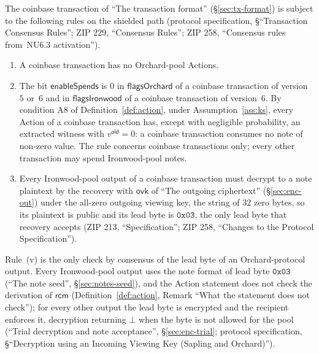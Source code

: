 \documentclass[11pt,a4paper]{article}
\theoremstyle{definition}
\newcommand{\ovk}{\ensuremath{\mathsf{ovk}}}
\newcommand{\rcm}{\ensuremath{\mathsf{rcm}}}
\begin{document}
The coinbase transaction of ``The transaction format''
(\S\ref{sec:tx-format}) is subject to the following rules on the shielded
path (protocol specification, \S``Transaction Consensus Rules''; ZIP 229,
``Consensus Rules''; ZIP 258, ``Consensus rules from~NU6.3 activation'').
\begin{enumerate}[label=(\roman*), resume]
\item A coinbase transaction has no Orchard-pool Actions.
\item The bit $\mathsf{enableSpends}$ is $0$ in $\mathsf{flagsOrchard}$ of a
  coinbase transaction of version~$5$ or~$6$ and in $\mathsf{flagsIronwood}$
  of a coinbase transaction of version~$6$. By condition A8 of
  Definition~\ref{def:action}, under Assumption~\ref{ass:ks}, every Action
  of a coinbase transaction has, except with negligible probability, an
  extracted witness with $v^{\mathsf{old}} = 0$: a coinbase transaction
  consumes no note of non-zero value. The rule concerns coinbase
  transactions only; every other transaction may spend Ironwood-pool notes.
\item Every Ironwood-pool output of a coinbase transaction must decrypt to a
  note plaintext by the recovery with $\ovk$ of ``The outgoing ciphertext''
  (\S\ref{sec:enc-out}) under the all-zero outgoing viewing key, the string
  of $32$ zero bytes, so its plaintext is public and its lead byte is
  $\mathtt{0x03}$, the only lead byte that recovery accepts (ZIP 213,
  ``Specification''; ZIP 258, ``Changes to the Protocol Specification'').
\end{enumerate}
Rule~(v) is the only check by consensus of the lead byte of an
Orchard-protocol output. Every Ironwood-pool output uses the note format of
lead byte $\mathtt{0x03}$ (``The note seed'', \S\ref{sec:notes-seed}), and
the Action statement does not check the
derivation of $\rcm$ (Definition~\ref{def:action}, Remark ``What the
statement does not check''); for every other output the lead byte is
encrypted and the recipient enforces it, decryption returning $\bot$ when
the byte is not allowed for the pool (``Trial decryption and note
acceptance'', \S\ref{sec:enc-trial}; protocol specification,
\S``Decryption using an Incoming Viewing Key (Sapling and Orchard)'').
\end{document}
